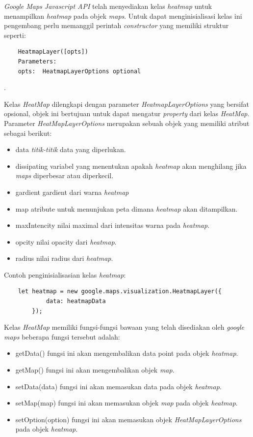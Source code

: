\textit{Google Maps Javascript API} telah menyediakan kelas \textit{heatmap} untuk menampilkan \textit{heatmap} pada objek \textit{maps}. Untuk dapat menginisialisasi kelas ini pengembang perlu memanggil perintah \textit{constructor} yang memiliki struktur seperti:
\begin{lstlisting}
    HeatmapLayer([opts])
    Parameters: 
    opts:  HeatmapLayerOptions optional
\end{lstlisting}.

Kelas \textit{HeatMap} dilengkapi dengan parameter \textit{HeatmapLayerOptions} yang bersifat opsional, objek ini  bertujuan untuk dapat mengatur \textit{property} dari kelas \textit{HeatMap}. Parameter \textit{HeatMapLayerOptions} merupakan sebuah objek yang memiliki atribut sebagai berikut:

\begin{itemize}
    \item data \textit{titik-titik} data yang diperlukan.
    \item dissipating variabel yang menentukan apakah \textit{heatmap} akan menghilang jika \textit{maps} diperbesar atau diperkecil.
    \item gardient gardient dari warna \textit{heatmap}
    \item map atribute untuk menunjukan peta dimana \textit{heatmap} akan ditampilkan.
    \item maxIntencity nilai maximal dari intensitas warna pada \textit{heatmap}.
    \item opcity nilai opacity dari \textit{heatmap}.
    \item radius nilai radius dari \textit{heatmap}.
\end{itemize}
Contoh penginisialisasian kelas \textit{heatmap}:
\begin{lstlisting}
    let heatmap = new google.maps.visualization.HeatmapLayer({
            data: heatmapData
        });
\end{lstlisting}
Kelas \textit{HeatMap} memiliki fungsi-fungsi bawaan yang telah disediakan oleh \textit{google maps} beberapa fungsi tersebut adalah:
\begin{itemize}
    \item getData() fungsi ini akan mengembalikan data point pada objek \textit{heatmap}.
    \item getMap() fungsi ini akan mengembalikan objek \textit{map}.
    \item setData(data) fungsi ini akan memasukan data pada objek \textit{heatmap}.
    \item setMap(map) fungsi ini akan memasukan objek \textit{map} pada objek \textit{heatmap}.
    \item setOption(option) fungsi ini akan memasukan  objek \textit{HeatMapLayerOptions} pada objek \textit{heatmap}.
\end{itemize}